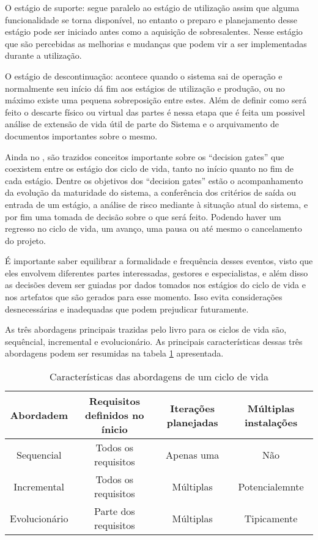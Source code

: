 	O estágio de suporte: segue paralelo ao estágio de utilização assim que alguma funcionalidade se torna disponível, no entanto o preparo e planejamento desse estágio pode 
	ser iniciado antes como a aquisição de sobresalentes. Nesse estágio que são percebidas as melhorias e mudanças que podem vir a ser implementadas durante a utilização.

	O estágio de descontinuação: acontece quando o sistema sai de operação e normalmente seu início dá fim aos estágios de utilização e produção, ou no máximo existe uma pequena
	sobreposição entre estes. Além de definir como será feito o descarte físico ou virtual das partes é nessa etapa que é feita um possivel análise de extensão de vida útil de parte do Sistema
	e o arquivamento de documentos importantes sobre o mesmo.

	Ainda no \cite{incoseHandbook}, são trazidos conceitos importante sobre os ``decision gates'' que coexistem entre os estágio dos ciclo de vida, tanto no início quanto no fim de cada estágio.
	Dentre os objetivos dos ``decision gates'' estão o acompanhamento da evolução da maturidade do sistema, a conferência dos critérios de saída ou entrada de um estágio,
	a análise de risco mediante à situação atual do sistema, e por fim uma tomada de decisão sobre o que será feito. Podendo haver um regresso no ciclo de vida, um avanço, uma pausa 
	ou até mesmo o cancelamento do projeto.

	É importante saber equilibrar a formalidade e frequência desses eventos, visto que eles envolvem diferentes partes interessadas, gestores e especialistas, e além disso as
	decisões devem ser guiadas por dados tomados nos estágios do ciclo de vida e nos artefatos que são gerados para esse momento. Isso evita considerações desnecessárias e 
	inadequadas que podem prejudicar futuramente.

	As três abordagens principais trazidas pelo livro para os ciclos de vida são, sequêncial, incremental e evolucionário. As principais características dessas três abordagens
	podem ser resumidas na tabela \ref{tab:revisao:ciclodevida:abordagens} apresentada.

	\begin{table}[!h]
		\centering
		\caption{Características das abordagens de um ciclo de vida}
		\begin{tabular}{cccc}
			\hline
			Abordadem & Requisitos definidos no ínicio & Iterações planejadas & Múltiplas instalações \\
			\hline
			Sequencial & Todos os requisitos & Apenas uma & Não\\
			Incremental & Todos os requisitos & Múltiplas & Potencialemnte\\
			Evolucionário & Parte dos requisitos & Múltiplas & Tipicamente\\
			\hline
		\end{tabular}
		\label{tab:revisao:ciclodevida:abordagens}
	\end{table}

